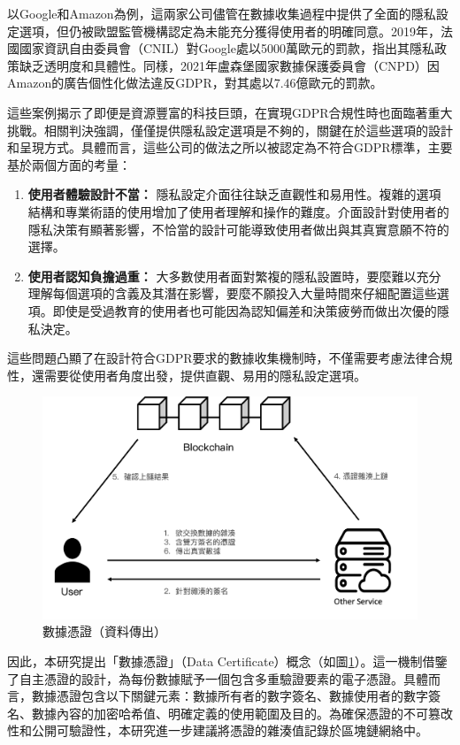 以Google和Amazon為例，這兩家公司儘管在數據收集過程中提供了全面的隱私設定選項，但仍被歐盟監管機構認定為未能充分獲得使用者的明確同意。2019年，法國國家資訊自由委員會（CNIL）對Google處以5000萬歐元的罰款，指出其隱私政策缺乏透明度和具體性\cite{CNIL_SAN-2019-001}。同樣，2021年盧森堡國家數據保護委員會（CNPD）因Amazon的廣告個性化做法違反GDPR，對其處以7.46億歐元的罰款\cite{SimmonsSimmons_AmazonGDPR}。

這些案例揭示了即便是資源豐富的科技巨頭，在實現GDPR合規性時也面臨著重大挑戰。相關判決強調，僅僅提供隱私設定選項是不夠的，關鍵在於這些選項的設計和呈現方式。具體而言，這些公司的做法之所以被認定為不符合GDPR標準，主要基於兩個方面的考量：
\begin{enumerate}
  \item \textbf{使用者體驗設計不當：} 隱私設定介面往往缺乏直觀性和易用性。複雜的選項結構和專業術語的使用增加了使用者理解和操作的難度。介面設計對使用者的隱私決策有顯著影響，不恰當的設計可能導致使用者做出與其真實意願不符的選擇。
  \item \textbf{使用者認知負擔過重：} 大多數使用者面對繁複的隱私設置時，要麼難以充分理解每個選項的含義及其潛在影響，要麼不願投入大量時間來仔細配置這些選項。即使是受過教育的使用者也可能因為認知偏差和決策疲勞而做出次優的隱私決定。
\end{enumerate}
這些問題凸顯了在設計符合GDPR要求的數據收集機制時，不僅需要考慮法律合規性，還需要從使用者角度出發，提供直觀、易用的隱私設定選項。

\begin{figure}
  \centering
  \includegraphics[width=\linewidth]{figures/min-data-perm.png}
  \caption{數據憑證（資料傳出）}
  \label{fig:min-data-perm}
\end{figure}
因此，本研究提出「數據憑證」（Data Certificate）概念（如圖\ref{fig:min-data-perm}）。這一機制借鑒了自主憑證\cite{NTU202102846}的設計，為每份數據賦予一個包含多重驗證要素的電子憑證。具體而言，數據憑證包含以下關鍵元素：數據所有者的數字簽名、數據使用者的數字簽名、數據內容的加密哈希值、明確定義的使用範圍及目的。為確保憑證的不可篡改性和公開可驗證性，本研究進一步建議將憑證的雜湊值記錄於區塊鏈網絡中。

